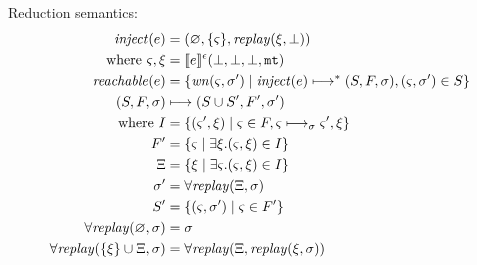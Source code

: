 \documentclass{llncs}
\newcommand{\inject}{\mathit{inject}}
\newcommand{\setof}[1]{\{ #1 \}}
\begin{document}
Reduction semantics:
\begin{align*}
\inject(\mexp) &= (\varnothing, \setof{\mstate}, \replay(\msdiff,\bot)) \\
 \text{ where } \mstate, \msdiff &= \compile{e}^{\mtcntr}(\bot,\bot,\bot,\kmt) \\
\reachable{\mexp} &= \setof{\wn(\mstate,\msto') \mid
                             \inject(\mexp) \machstep^* (S,F,\msto),
                             \ttuple{\mstate}{\msto'} \in S} \\
(S,F,\msto) &\machstep (S \cup S', F', \msto') \\
 \text{ where } I &=
   \setof{ \ttuple{\mstate'}{\msdiff} \mid \mstate \in F, \mstate \machstep_\msto \mstate', \msdiff} \\
   F' &= \setof{\mstate \mid \exists \msdiff. \ttuple{\mstate}{\msdiff} \in I} \\
   \Xi &= \setof{\msdiff \mid \exists \mstate. \ttuple{\mstate}{\msdiff} \in I} \\
   \msto' &= \replayall(\Xi,\msto) \\
   S' &= \setof{\ttuple{\mstate}{\msto'} \mid \mstate \in F'} \\
   \replayall(\varnothing,\msto) &= \msto \\
   \replayall(\setof{\msdiff} \cup \Xi, \msto) &= \replayall(\Xi, \replay(\msdiff, \msto))
\end{align*}

\end{document}
